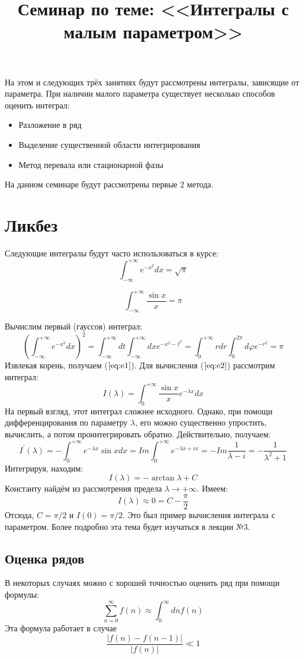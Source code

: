\documentclass[a4paper,12pt]{article}
\begin{document}
\title{Семинар по теме: <<Интегралы с малым параметром>>}

\maketitle
На этом и следующих трёх занятиях будут рассмотрены интегралы, зависящие от параметра. При наличии малого параметра существует несколько способов оценить интеграл:
\begin{itemize}
	\item Разложение в ряд
	\item Выделение существенной области интегрирования
	\item Метод перевала или стационарной фазы
\end{itemize}
На данном семинаре будут рассмотрены первые 2 метода.
\section*{Ликбез}
Следующие интегралы будут часто использоваться в курсе:
\begin{equation}\label{eq:e1}
\int_{-\infty}^{+\infty} e^{-x^2} dx= \sqrt{\pi}
\end{equation}

\begin{equation}\label{eq:e2}
\int_{-\infty}^{+\infty} \frac{\sin x}{x}=\pi
\end{equation}

Вычислим первый (гауссов) интеграл:
$$
\left(\int_{-\infty}^{+\infty} e^{-x^2} dx\right)^2=\int_{-\infty}^{+\infty} dt \int_{-\infty}^{+\infty} dx e^{-x^2-t^2}=\int_{0}^{+\infty} r dr \int_{0}^{2\pi} d\varphi e^{-r^2}=\pi
$$
Извлекая корень, получаем ($\ref{eq:e1}$). Для вычисления ($\ref{eq:e2}$) рассмотрим интеграл:
$$
I(\lambda)=\int_{0}^{+\infty}\frac{\sin x}{x}e^{-\lambda x} dx
$$
На первый взгляд, этот интеграл сложнее исходного. Однако, при помощи дифференцирования по параметру $\lambda$, его можно существенно упростить, вычислить, а потом проинтегрировать обратно. Действительно, получаем:
$$
I^{'}(\lambda)=-\int_{0}^{+\infty}e^{-\lambda x}\sin x dx=Im\int_{0}^{+\infty}e^{-\lambda x+ix}=-Im\frac{1}{\lambda-i}=-\frac{1}{\lambda^2+1}
$$
Интегрируя, находим:
$$
I(\lambda)=-\arctan\lambda+C
$$
Константу найдём из рассмотрения предела $\lambda\to+\infty$. Имеем:
$$
I(\lambda)\approx0=C-\frac{\pi}{2}
$$
Отсюда, $C=\pi/2$ и $I(0)=\pi/2$.
Это был пример вычисления интеграла с параметром. Более подробно эта тема будет изучаться в лекции №3.

\subsection*{Оценка рядов}
В некоторых случаях можно с хорошей точностью оценить ряд при помощи формулы:
$$
\sum_{n=0}^{\infty} f(n)\approx\int_{0}^{\infty} dn f(n)
$$
Эта формула работает в случае
$$
\frac{|f(n)-f(n-1)|}{|f(n)|}\ll1
$$
\end{document}
